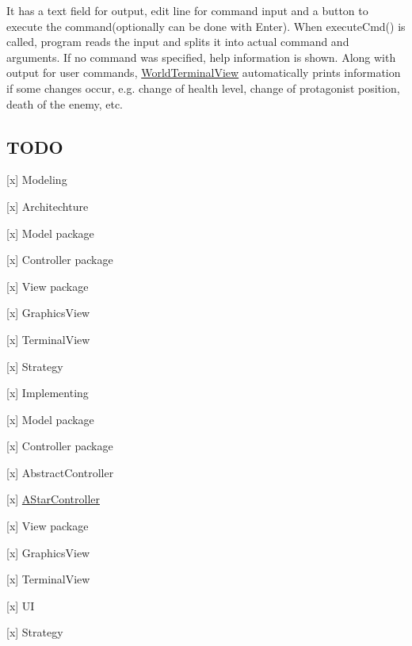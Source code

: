 It has a text field for output, edit line for command input and a button to execute the command(optionally can be done with {\ttfamily Enter}). When {\ttfamily execute\+Cmd()} is called, program reads the input and splits it into actual command and arguments. If no command was specified, help information is shown. Along with output for user commands, {\ttfamily \hyperlink{classWorldTerminalView}{World\+Terminal\+View}} automatically prints information if some changes occur, e.\+g. change of health level, change of protagonist position, death of the enemy, etc.

\subsection*{T\+O\+DO}


\begin{DoxyItemize}
\item \mbox{[}x\mbox{]} Modeling
\begin{DoxyItemize}
\item \mbox{[}x\mbox{]} Architechture
\item \mbox{[}x\mbox{]} Model package
\item \mbox{[}x\mbox{]} Controller package
\item \mbox{[}x\mbox{]} View package
\begin{DoxyItemize}
\item \mbox{[}x\mbox{]} Graphics\+View
\item \mbox{[}x\mbox{]} Terminal\+View
\end{DoxyItemize}
\item \mbox{[}x\mbox{]} Strategy
\end{DoxyItemize}
\item \mbox{[}x\mbox{]} Implementing
\begin{DoxyItemize}
\item \mbox{[}x\mbox{]} Model package
\item \mbox{[}x\mbox{]} Controller package
\begin{DoxyItemize}
\item \mbox{[}x\mbox{]} Abstract\+Controller
\item \mbox{[}x\mbox{]} \hyperlink{classAStarController}{A\+Star\+Controller}
\end{DoxyItemize}
\item \mbox{[}x\mbox{]} View package
\begin{DoxyItemize}
\item \mbox{[}x\mbox{]} Graphics\+View
\item \mbox{[}x\mbox{]} Terminal\+View
\end{DoxyItemize}
\item \mbox{[}x\mbox{]} UI
\item \mbox{[}x\mbox{]} Strategy 
\end{DoxyItemize}
\end{DoxyItemize}